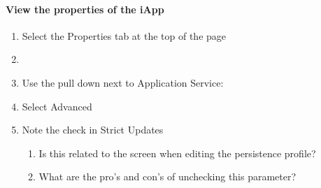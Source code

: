 \documentclass[letterpaper,10pt,english]{sphinxmanual}
\begin{document}
\paragraph{View the properties of the iApp}
\label{\detokenize{class2/module1/lab1:view-the-properties-of-the-iapp}}\begin{enumerate}
\item {} 
Select the Properties tab at the top of the page

\item {} 

\item {} 
Use the pull down next to Application Service:

\item {} 
Select Advanced

\item {} 
Note the check in Strict Updates
\begin{enumerate}
\item {} 
Is this related to the screen when editing the persistence
profile?

\item {} 
What are the pro’s and con’s of unchecking this parameter?

\end{enumerate}

\end{enumerate}
\end{document}
